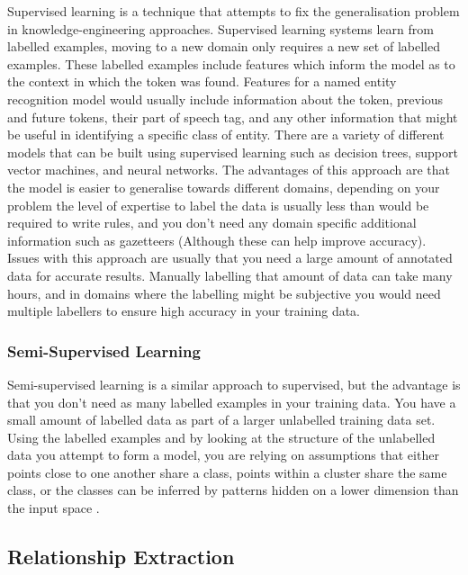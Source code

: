 \documentclass[11pt,oneside]{book}
\begin{document}
Supervised learning is a technique that attempts to fix the generalisation problem in knowledge-engineering approaches. Supervised learning systems learn from labelled examples, moving to a new domain only requires a new set of labelled examples. These labelled examples include features which inform the model as to the context in which the token was found. Features for a named entity recognition model would usually include information about the token, previous and future tokens, their part of speech tag, and any other information that might be useful in identifying a specific class of entity. There are a variety of different models that can be built using supervised learning such as decision trees, support vector machines, and neural networks. The advantages of this approach are that the model is easier to generalise towards different domains, depending on your problem the level of expertise to label the data is usually less than would be required to write rules, and you don’t need any domain specific additional information such as gazetteers (Although these can help improve accuracy). Issues with this approach are usually that you need a large amount of annotated data for accurate results. Manually labelling that amount of data can take many hours, and in domains where the labelling might be subjective you would need multiple labellers to ensure high accuracy in your training data.

\subsubsection{Semi-Supervised Learning}

Semi-supervised learning is a similar approach to supervised, but the advantage is that you don’t need as many labelled examples in your training data. You have a small amount of labelled data as part of a larger unlabelled training data set. Using the labelled examples and by looking at the structure of the unlabelled data you attempt to form a model, you are relying on assumptions that either points close to one another share a class, points within a cluster share the same class, or the classes can be inferred by patterns hidden on a lower dimension than the input space \citep{semi-supervised_learning}.

\subsection{Relationship Extraction}
\end{document}
